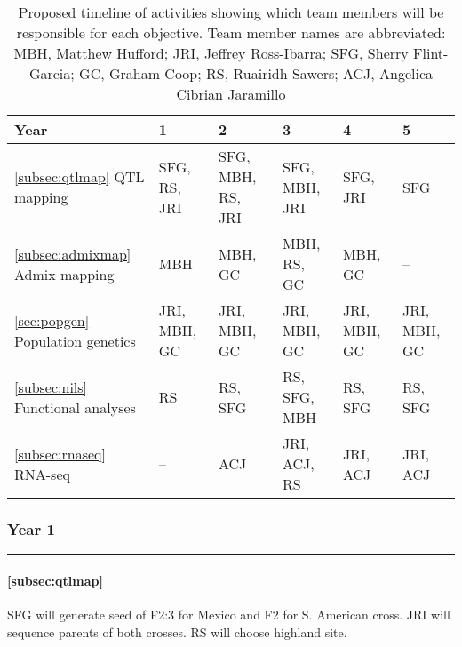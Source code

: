 \begin{table}[t!]
\label{tab:timeline}
\begin{center}
\begin{tabular}{p{3.5cm}p{2cm}p{2cm}p{2cm}p{2cm}p{2cm}}\\\toprule  
{\bf Year} & {\bf 1} & {\bf 2} & {\bf 3} & {\bf 4} & {\bf 5} \\\midrule
\ref{subsec:qtlmap} \hspace{3cm} QTL mapping 			& SFG, RS, JRI 	& SFG, MBH, RS, JRI 	& SFG, MBH, JRI 	& SFG, JRI			& SFG \\\midrule
\ref{subsec:admixmap} \hspace{3cm} Admix mapping		& MBH 				& MBH, GC 		& MBH, RS, GC 			& MBH, GC			& -- \\\midrule
\ref{sec:popgen} \hspace{3cm} Population genetics		& JRI, MBH, GC 		& JRI, MBH, GC  	& JRI, MBH, GC		& JRI, MBH, GC 	& JRI, MBH, GC \\\midrule
\ref{subsec:nils} \hspace{2cm} Functional \mbox{analyses} 		& RS 				& RS, SFG		& RS, SFG, MBH 			& RS, SFG 	& RS, SFG  \\\midrule
\ref{subsec:rnaseq} \hspace{2cm} RNA-seq 				& --  					& ACJ 				& JRI, ACJ, RS  			& JRI, ACJ	& JRI, ACJ \\\bottomrule
\end{tabular}
\caption{Proposed timeline of activities showing which team members will be responsible for each objective. Team member names are abbreviated: MBH, Matthew Hufford; JRI, Jeffrey Ross-Ibarra; SFG, Sherry Flint-Garcia; GC, Graham Coop; RS, Ruairidh Sawers; ACJ, Angelica Cibrian Jaramillo}\label{tab:timeline}
\end{center}
\end{table} 

\subsubsection*{Year 1} \hrule \vspace{0.1cm}

\paragraph{  \bf \ref{subsec:qtlmap}} SFG will generate seed of F2:3 for Mexico and F2 for S. American cross.  JRI will sequence parents of both crosses. RS will choose highland site.
